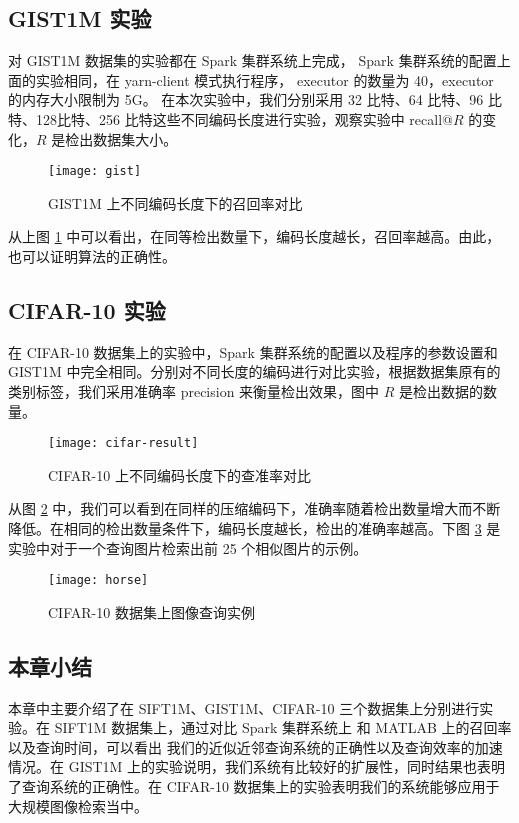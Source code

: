\subsection{GIST1M 实验}
对 GIST1M 数据集的实验都在 Spark 集群系统上完成， Spark 集群系统的配置上面的实验相同，在 yarn-client 模式执行程序， executor 的数量为 40，executor 的内存大小限制为 5G。 在本次实验中，我们分别采用 32 比特、64 比特、96 比特、128比特、256 比特这些不同编码长度进行实验，观察实验中 recall@$R$ 的变化，$R$ 是检出数据集大小。
\begin{figure}[H]
  \centering
  \texttt{[image: gist]}
  \caption{GIST1M 上不同编码长度下的召回率对比}
  \label{fig:gist}
\end{figure}
从上图 \ref{fig:gist} 中可以看出，在同等检出数量下，编码长度越长，召回率越高。由此，也可以证明算法的正确性。
\subsection{CIFAR-10 实验}
在 CIFAR-10 数据集上的实验中，Spark 集群系统的配置以及程序的参数设置和 GIST1M 中完全相同。分别对不同长度的编码进行对比实验，根据数据集原有的类别标签，我们采用准确率 precision 来衡量检出效果，图中 $R$ 是检出数据的数量。
\begin{figure}[H]
  \centering
  \texttt{[image: cifar-result]}
  \caption{CIFAR-10 上不同编码长度下的查准率对比}
  \label{fig:cifar-result}
\end{figure}
从图 \ref{fig:cifar-result} 中，我们可以看到在同样的压缩编码下，准确率随着检出数量增大而不断降低。在相同的检出数量条件下，编码长度越长，检出的准确率越高。下图 \ref{fig:horse} 是实验中对于一个查询图片检索出前 25 个相似图片的示例。
\begin{figure}[H]
  \centering
  \texttt{[image: horse]}
  \caption{CIFAR-10 数据集上图像查询实例}
  \label{fig:horse}
\end{figure}
\subsection{本章小结}
本章中主要介绍了在 SIFT1M、GIST1M、CIFAR-10 三个数据集上分别进行实验。在 SIFT1M 数据集上，通过对比 Spark 集群系统上 和 MATLAB 上的召回率以及查询时间，可以看出 我们的近似近邻查询系统的正确性以及查询效率的加速情况。在 GIST1M 上的实验说明，我们系统有比较好的扩展性，同时结果也表明了查询系统的正确性。在 CIFAR-10 数据集上的实验表明我们的系统能够应用于大规模图像检索当中。 
